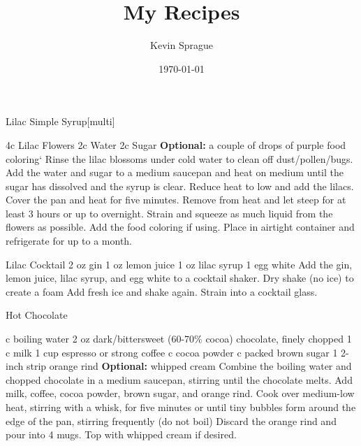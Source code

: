 \documentclass[12pt]{cookbook}
\title{My Recipes}
\author{Kevin Sprague}
\date{\today}
\begin{document}
\begin{recipe}{Lilac Simple Syrup}[multi]

\ingredients
	{4c Lilac Flowers}
	{2c Water}
	{2c Sugar}
	{\textbf{Optional:} a couple of drops of purple food coloring}`
\stopingredients
\preparation
	{Rinse the lilac blossoms under cold water to clean off dust/pollen/bugs.}
	{Add the water and sugar to a medium saucepan and heat on medium until the sugar has dissolved and the syrup is clear.}
	{Reduce heat to low and add the lilacs. Cover the pan and heat for five minutes.}
	{Remove from heat and let steep for at least 3 hours or up to overnight.}
	{Strain and squeeze as much liquid from the flowers as possible.}
	{Add the food coloring if using.}
	{Place in airtight container and refrigerate for up to a month.}
\stopprep
\end{recipe}
\begin{recipe}{Lilac Cocktail}
\ingredients
    {2 oz gin}
    {1 oz lemon juice}
    {1 oz lilac syrup}
    {1 egg white}
\stopingredients
\preparation
    {Add the gin, lemon juice, lilac syrup, and egg white to a cocktail shaker. Dry shake (no ice) to create a foam}
    {Add fresh ice and shake again.}
    {Strain into a cocktail glass.}
\stopprep
\end{recipe}
\begin{recipe}{Hot Chocolate}
\begin{center}
\end{center}
\ingredients
    { c boiling water}
    {2 oz dark/bittersweet (60-70\% cocoa) chocolate, finely chopped}
    {1  c milk}
    {1 cup espresso or strong coffee}
    { c cocoa powder}
    { c packed brown sugar}
    {1 2-inch strip orange rind}
    {\textbf{Optional:} whipped cream}
\stopingredients
\preparation
    {Combine the boiling water and chopped chocolate in a medium saucepan, stirring until the chocolate melts.}
    {Add milk, coffee, cocoa powder, brown sugar, and orange rind. Cook over medium-low heat, stirring with a whisk, for five minutes or until tiny bubbles form around the edge of the pan, stirring frequently (do not boil)}
    {Discard the orange rind and pour into 4 mugs.}
    {Top with whipped cream if desired.}
\stopprep
\end{recipe}
\end{document}
